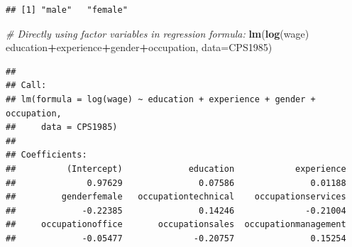 \documentclass[]{book}
\newenvironment{Shaded}{\begin{snugshade}}{\end{snugshade}}
\newcommand{\CommentTok}[1]{\textcolor[rgb]{0.56,0.35,0.01}{\textit{#1}}}
\newcommand{\DataTypeTok}[1]{\textcolor[rgb]{0.13,0.29,0.53}{#1}}
\newcommand{\KeywordTok}[1]{\textcolor[rgb]{0.13,0.29,0.53}{\textbf{#1}}}
\newcommand{\NormalTok}[1]{#1}
\newcommand{\OperatorTok}[1]{\textcolor[rgb]{0.81,0.36,0.00}{\textbf{#1}}}
\newcommand{\StringTok}[1]{\textcolor[rgb]{0.31,0.60,0.02}{#1}}
\begin{document}
\begin{Shaded}
\end{Shaded}

\begin{verbatim}
## [1] "male"   "female"
\end{verbatim}

\begin{Shaded}
\begin{Highlighting}[]
\CommentTok{# Directly using factor variables in regression formula:}
\KeywordTok{lm}\NormalTok{(}\KeywordTok{log}\NormalTok{(wage) }\OperatorTok{~}\StringTok{ }\NormalTok{education}\OperatorTok{+}\NormalTok{experience}\OperatorTok{+}\NormalTok{gender}\OperatorTok{+}\NormalTok{occupation, }\DataTypeTok{data=}\NormalTok{CPS1985)}
\end{Highlighting}
\end{Shaded}

\begin{verbatim}
## 
## Call:
## lm(formula = log(wage) ~ education + experience + gender + occupation, 
##     data = CPS1985)
## 
## Coefficients:
##          (Intercept)             education            experience  
##              0.97629               0.07586               0.01188  
##         genderfemale   occupationtechnical    occupationservices  
##             -0.22385               0.14246              -0.21004  
##     occupationoffice       occupationsales  occupationmanagement  
##             -0.05477              -0.20757               0.15254
\end{verbatim}

\begin{Shaded}
\end{Shaded}
\end{document}
